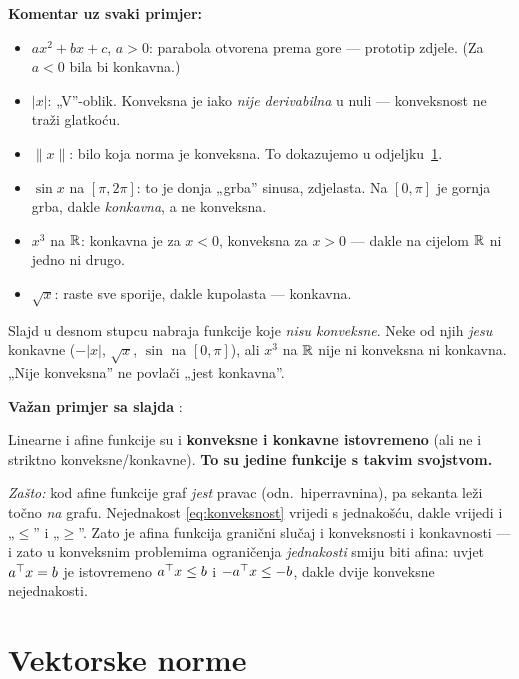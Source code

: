 \textbf{Komentar uz svaki primjer:}
\begin{itemize}
  \item $ax^2+bx+c$, $a>0$: parabola otvorena prema gore --- prototip zdjele.
        (Za $a<0$ bila bi konkavna.)
  \item $|x|$: „V”-oblik. Konveksna je iako \emph{nije derivabilna} u nuli ---
        konveksnost ne traži glatkoću.
  \item $\|x\|$: bilo koja norma je konveksna. To dokazujemo u
        odjeljku~\ref{sec:norme}.
  \item $\sin x$ na $[\pi, 2\pi]$: to je donja „grba” sinusa, zdjelasta.
        Na $[0,\pi]$ je gornja grba, dakle \emph{konkavna}, a ne konveksna.
  \item $x^3$ na $\mathbb{R}$: konkavna je za $x<0$, konveksna za $x>0$ --- dakle na
        cijelom $\mathbb{R}$ ni jedno ni drugo.
  \item $\sqrt{x}$: raste sve sporije, dakle kupolasta --- konkavna.
\end{itemize}

\begin{napomena}
Slajd u desnom stupcu nabraja funkcije koje \emph{nisu konveksne}. Neke od njih
\emph{jesu} konkavne ($-|x|$, $\sqrt x$, $\sin$ na $[0,\pi]$), ali $x^3$ na
$\mathbb{R}$ nije ni konveksna ni konkavna. „Nije konveksna” ne povlači „jest
konkavna”.
\end{napomena}

\textbf{Važan primjer sa slajda} :

\begin{teorem}
Linearne i afine funkcije su i \textbf{konveksne i konkavne istovremeno} (ali
ne i striktno konveksne/konkavne). \textbf{To su jedine funkcije s takvim
svojstvom.}
\end{teorem}

\emph{Zašto:} kod afine funkcije graf \emph{jest} pravac (odn.\ hiperravnina),
pa sekanta leži točno \emph{na} grafu. Nejednakost
\eqref{eq:konveksnost} vrijedi s jednakošću, dakle vrijedi i „$\le$” i „$\ge$”.
Zato je afina funkcija granični slučaj i konveksnosti i konkavnosti --- i zato
u konveksnim problemima ograničenja \emph{jednakosti} smiju biti afina: uvjet
$a^{\top} x = b$ je istovremeno $a^{\top} x \le b$ i $-a^{\top} x \le -b$, dakle dvije
konveksne nejednakosti.

\section{Vektorske norme}
\label{sec:norme}

